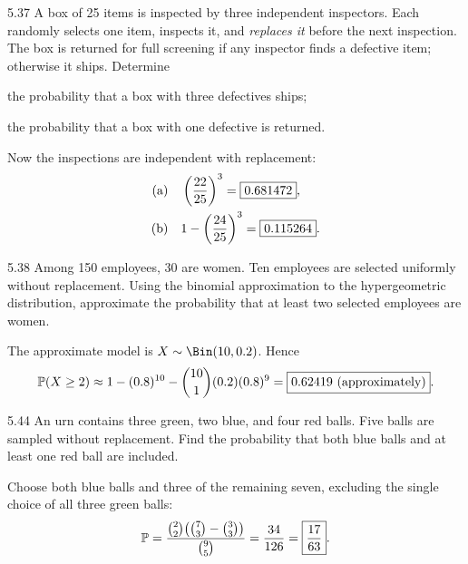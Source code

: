 \documentclass[11pt,oneside]{article}
\begin{document}
\begin{exercise}{5.37}
A box of 25 items is inspected by three independent inspectors. Each randomly selects one item, inspects it, and \emph{replaces it} before the next inspection. The box is returned for full screening if any inspector finds a defective item; otherwise it ships. Determine
\par
\begin{exercisesubparts}
\item the probability that a box with three defectives ships;
\item the probability that a box with one defective is returned.
\end{exercisesubparts}
\end{exercise}

\begin{solution}
Now the inspections are independent with replacement:
\begin{align*}
\textup{(a)}\quad&\left(\frac{22}{25}\right)^3=\boxed{0.681472},\\
\textup{(b)}\quad&1-\left(\frac{24}{25}\right)^3=\boxed{0.115264}.
\end{align*}
\end{solution}

\begin{exercise}{5.38}
Among 150 employees, 30 are women. Ten employees are selected uniformly without replacement. Using the binomial approximation to the hypergeometric distribution, approximate the probability that at least two selected employees are women.
\end{exercise}

\begin{solution}
The approximate model is $X\sim\Bin(10,0.2)$. Hence
\[
\mathbb{P}(X\ge2)\approx1-(0.8)^{10}-\binom{10}{1}(0.2)(0.8)^9=\boxed{0.62419\text{ (approximately)}}.
\]
\end{solution}

\begin{exercise}{5.44}
An urn contains three green, two blue, and four red balls. Five balls are sampled without replacement. Find the probability that both blue balls and at least one red ball are included.
\end{exercise}

\begin{solution}
Choose both blue balls and three of the remaining seven, excluding the single choice of all three green balls:
\[
\mathbb{P}=\frac{\binom{2}{2}\bigl(\binom{7}{3}-\binom{3}{3}\bigr)}{\binom{9}{5}}
=\frac{34}{126}=\boxed{\frac{17}{63}}.
\]
\end{solution}
\end{document}
